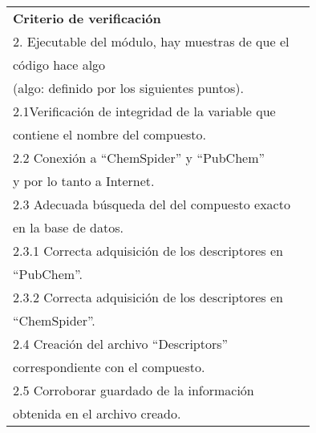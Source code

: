 \begin{longtable}{|l|l|}
\textbf{Criterio de verificación}                                                      & \begin{tabular}[c]{@{}l@{}}1. Compilación del código.\\ 2. Ejecutable del módulo, hay muestras de que el \\ código hace algo\\ (algo: definido por los siguientes puntos).\\ 2.1Verificación de integridad de la variable que \\ contiene el nombre del compuesto.\\ 2.2 Conexión a  “ChemSpider” y “PubChem” \\ y por lo tanto a Internet.\\ 2.3 Adecuada búsqueda del del compuesto exacto \\ en la base de datos.\\ 2.3.1 Correcta adquisición de los descriptores en\\ “PubChem”.\\ 2.3.2 Correcta adquisición de los descriptores en\\ “ChemSpider”.\\ 2.4 Creación del archivo “Descriptors” \\ correspondiente con el compuesto.\\ 2.5 Corroborar guardado de la información \\ obtenida en el archivo creado.\end{tabular}                                                                                                                                                          \\ \hline

\end{longtable}
